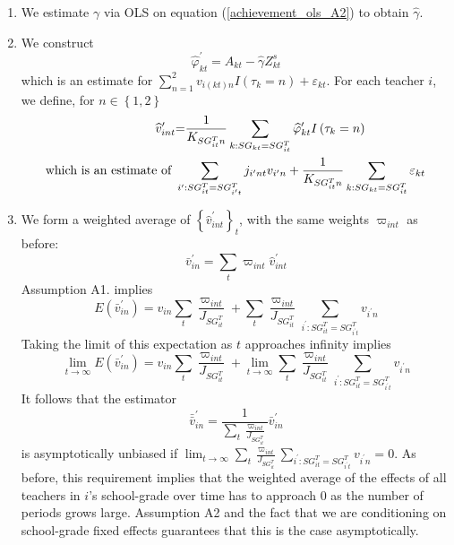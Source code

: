 \documentclass[notitlepage,12pt]{article}%
\begin{document}
\begin{enumerate}
\item We estimate $\gamma$ via OLS on equation (\ref{achievement_ols_A2}) to
obtain $\widehat{\gamma}.$

\item We construct
\begin{equation}
\widehat{\varphi}_{kt}^{\prime}=A_{kt}-\hat{\gamma}Z_{kt}^{s}%
\end{equation}
which is an estimate for $\sum_{n=1}^{2}v_{i(kt)n}I(\tau_{k}=n)+\varepsilon
_{kt}$. For each teacher $i$, we define, for $n\in\left\{  1,2\right\}  $%
\begin{align}
{\small \widehat{v}_{int}^{\prime}}  &  {\small =}\frac{1}{K_{SG_{it}^{T}n}%
}\sum_{k:SG_{kt}=SG_{it}^{T}}\widehat{\varphi}_{kt}^{\prime}I\left(  \tau
_{k}=n\right) \label{vhatprime}\\
\mbox{which is an estimate of }  &  \sum_{i^{\prime}:SG_{it}^{T}%
=SG_{i^{\prime}t}^{T}}j_{i^{\prime}nt}v_{i^{\prime}n}+\frac{1}{K_{SG_{it}%
^{T}n}}\sum_{k:SG_{kt}=SG_{it}^{T}}\varepsilon_{kt}%
\end{align}


\item We form a weighted average of $\left\{  \widehat{v}_{int}^{\prime
}\right\}  _{t}$, with the same weights $\varpi_{int}$ as before:
\[
\bar{v}_{in}^{\prime}=\sum_{t}\varpi_{int}\widehat{v}_{int}^{\prime}%
\]
Assumption A1. implies
\[
E(\bar{v}_{in}^{\prime})=v_{in}\sum_{t}\frac{\varpi_{int}}{J_{SG_{it}^{T}}%
}+\sum_{t}\frac{\varpi_{int}}{J_{SG_{it}^{T}}}\sum_{i^{\prime}:SG_{it}%
^{T}=SG_{i^{\prime}t}^{T}}v_{i^{\prime}n}%
\]
Taking the limit of this expectation as $t$ approaches infinity implies
\[
\lim_{t\rightarrow\infty}E(\bar{v}_{in}^{\prime})=v_{in}\sum_{t}\frac
{\varpi_{int}}{J_{SG_{it}^{T}}}+\lim_{t\rightarrow\infty}\sum_{t}\frac
{\varpi_{int}}{J_{SG_{it}^{T}}}\sum_{i^{\prime}:SG_{it}^{T}=SG_{i^{\prime}%
t}^{T}}v_{i^{\prime}n}%
\]
It follows that the estimator%
\begin{equation}
\bar{\bar{v}}_{in}^{\prime}=\frac{1}{\sum_{t}\frac{\varpi_{int}}%
{J_{SG_{it}^{T}}}}\bar{v}_{in}^{\prime} \label{unshrunk2}%
\end{equation}
is asymptotically unbiased if $\lim_{t\rightarrow\infty}\sum_{t}\frac
{\varpi_{int}}{J_{SG_{it}^{T}}}\sum_{i^{\prime}:SG_{it}^{T}=SG_{i^{\prime}%
t}^{T}}v_{i^{\prime}n}=0$. As before, this requirement implies that the
weighted average of the effects of all teachers in $i$'s school-grade over
time has to approach $0$ as the number of periods grows large. Assumption A2
and the fact that we are conditioning on school-grade fixed effects guarantees
that this is the case asymptotically.


\end{enumerate}
\end{document}
